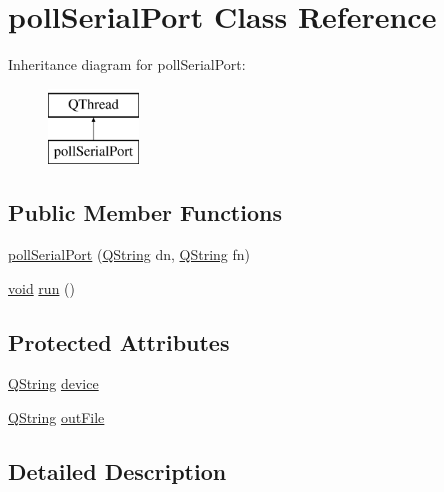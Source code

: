 \hypertarget{classpoll_serial_port}{\section{poll\-Serial\-Port Class Reference}
\label{classpoll_serial_port}
}
Inheritance diagram for poll\-Serial\-Port\-:\begin{figure}[H]
\begin{center}
\leavevmode
\includegraphics[height=2.000000cm]{classpoll_serial_port}
\end{center}
\end{figure}
\subsection*{Public Member Functions}
\begin{DoxyCompactItemize}
\item 
\hyperlink{classpoll_serial_port_af8f9e242cfbf21ae5010d9ff76bc530e}{poll\-Serial\-Port} (\hyperlink{group___u_a_v_objects_plugin_gab9d252f49c333c94a72f97ce3105a32d}{Q\-String} dn, \hyperlink{group___u_a_v_objects_plugin_gab9d252f49c333c94a72f97ce3105a32d}{Q\-String} fn)
\item 
\hyperlink{group___u_a_v_objects_plugin_ga444cf2ff3f0ecbe028adce838d373f5c}{void} \hyperlink{classpoll_serial_port_aba67835ac371b8805f56c32f60beb4eb}{run} ()
\end{DoxyCompactItemize}
\subsection*{Protected Attributes}
\begin{DoxyCompactItemize}
\item 
\hyperlink{group___u_a_v_objects_plugin_gab9d252f49c333c94a72f97ce3105a32d}{Q\-String} \hyperlink{classpoll_serial_port_a86012d930c44e797eef10f33af7f0c19}{device}
\item 
\hyperlink{group___u_a_v_objects_plugin_gab9d252f49c333c94a72f97ce3105a32d}{Q\-String} \hyperlink{classpoll_serial_port_a23012b7e6b01a832c94542dcae352236}{out\-File}
\end{DoxyCompactItemize}


\subsection{Detailed Description}



